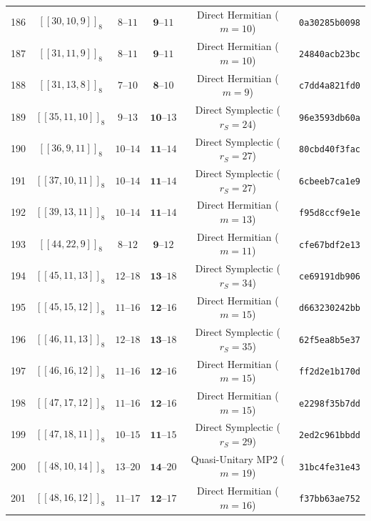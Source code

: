 \documentclass[11pt,a4paper]{article}
\theoremstyle{remark}
\begin{document}
{\begin{longtable}{@{}rccccl@{}}
186 & $[[30,10,9]]_{8}$ & $8\text{--}11$ & $\mathbf{9}\text{--}11$ & Direct Hermitian ($m=10$) & \texttt{0a30285b0098} \\
187 & $[[31,11,9]]_{8}$ & $8\text{--}11$ & $\mathbf{9}\text{--}11$ & Direct Hermitian ($m=10$) & \texttt{24840acb23bc} \\
188 & $[[31,13,8]]_{8}$ & $7\text{--}10$ & $\mathbf{8}\text{--}10$ & Direct Hermitian ($m=9$) & \texttt{c7dd4a821fd0} \\
189 & $[[35,11,10]]_{8}$ & $9\text{--}13$ & $\mathbf{10}\text{--}13$ & Direct Symplectic ($r_S=24$) & \texttt{96e3593db60a} \\
190 & $[[36,9,11]]_{8}$ & $10\text{--}14$ & $\mathbf{11}\text{--}14$ & Direct Symplectic ($r_S=27$) & \texttt{80cbd40f3fac} \\
191 & $[[37,10,11]]_{8}$ & $10\text{--}14$ & $\mathbf{11}\text{--}14$ & Direct Symplectic ($r_S=27$) & \texttt{6cbeeb7ca1e9} \\
192 & $[[39,13,11]]_{8}$ & $10\text{--}14$ & $\mathbf{11}\text{--}14$ & Direct Hermitian ($m=13$) & \texttt{f95d8ccf9e1e} \\
193 & $[[44,22,9]]_{8}$ & $8\text{--}12$ & $\mathbf{9}\text{--}12$ & Direct Hermitian ($m=11$) & \texttt{cfe67bdf2e13} \\
194 & $[[45,11,13]]_{8}$ & $12\text{--}18$ & $\mathbf{13}\text{--}18$ & Direct Symplectic ($r_S=34$) & \texttt{ce69191db906} \\
195 & $[[45,15,12]]_{8}$ & $11\text{--}16$ & $\mathbf{12}\text{--}16$ & Direct Hermitian ($m=15$) & \texttt{d663230242bb} \\
196 & $[[46,11,13]]_{8}$ & $12\text{--}18$ & $\mathbf{13}\text{--}18$ & Direct Symplectic ($r_S=35$) & \texttt{62f5ea8b5e37} \\
197 & $[[46,16,12]]_{8}$ & $11\text{--}16$ & $\mathbf{12}\text{--}16$ & Direct Hermitian ($m=15$) & \texttt{ff2d2e1b170d} \\
198 & $[[47,17,12]]_{8}$ & $11\text{--}16$ & $\mathbf{12}\text{--}16$ & Direct Hermitian ($m=15$) & \texttt{e2298f35b7dd} \\
199 & $[[47,18,11]]_{8}$ & $10\text{--}15$ & $\mathbf{11}\text{--}15$ & Direct Symplectic ($r_S=29$) & \texttt{2ed2c961bbdd} \\
200 & $[[48,10,14]]_{8}$ & $13\text{--}20$ & $\mathbf{14}\text{--}20$ & Quasi-Unitary MP2 ($m=19$) & \texttt{31bc4fe31e43} \\
201 & $[[48,16,12]]_{8}$ & $11\text{--}17$ & $\mathbf{12}\text{--}17$ & Direct Hermitian ($m=16$) & \texttt{f37bb63ae752} \\

\end{longtable}}
\end{document}
